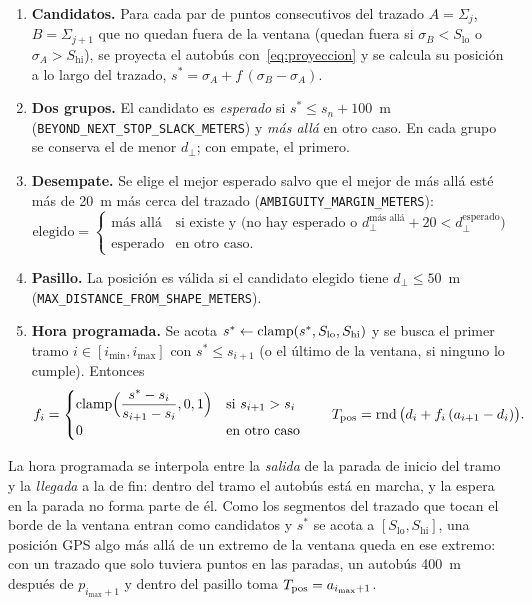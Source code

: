 \begin{enumerate}
  \item \textbf{Candidatos.} Para cada par de puntos consecutivos del trazado $A=\Sigma_j$, $B=\Sigma_{j+1}$ que no
        quedan fuera de la ventana (quedan fuera si $\sigma_B<S_{\mathrm{lo}}$ o $\sigma_A>S_{\mathrm{hi}}$), se
        proyecta el autobús con~\eqref{eq:proyeccion} y se calcula su posición a lo largo del trazado,
        $s^\ast=\sigma_A+f\,(\sigma_B-\sigma_A)$.
  \item \textbf{Dos grupos.} El candidato es \emph{esperado} si $s^\ast\le s_n+100$~m
        (\texttt{BEYOND\_NEXT\_STOP\_SLACK\_METERS}) y \emph{más allá} en otro caso. En cada grupo se conserva el de menor
        $d_\perp$; con empate, el primero.
  \item \textbf{Desempate.} Se elige el mejor esperado salvo que el mejor de más allá esté más de 20~m más cerca del
        trazado (\texttt{AMBIGUITY\_MARGIN\_METERS}):
        \[
        \text{elegido}=\begin{cases}\text{más allá}&\text{si existe y } \big(\text{no hay esperado o }d_\perp^{\text{más allá}}+20<d_\perp^{\text{esperado}}\big)\\
        \text{esperado}&\text{en otro caso.}\end{cases}
        \]
  \item \textbf{Pasillo.} La posición es válida si el candidato elegido tiene $d_\perp\le50$~m
        (\texttt{MAX\_DISTANCE\_FROM\_SHAPE\_METERS}).
  \item \textbf{Hora programada.} Se acota $s^\ast\leftarrow\operatorname{clamp}(s^\ast,S_{\mathrm{lo}},S_{\mathrm{hi}})$ y se
        busca el primer tramo $i\in[i_{\min},i_{\max}]$ con $s^\ast\le s_{i+1}$ (o el último de la ventana, si ninguno lo
        cumple). Entonces
        \begin{equation}
        \label{eq:tpos}
        f_i=\begin{cases}\operatorname{clamp}\!\Big(\dfrac{s^\ast-s_i}{s_{i+1}-s_i},0,1\Big)&\text{si }s_{i+1}>s_i\\ 0&\text{en otro caso}\end{cases}
        \qquad
        T_{\mathrm{pos}}=\operatorname{rnd}\big(d_i+f_i\,(a_{i+1}-d_i)\big).
        \end{equation}
\end{enumerate}

La hora programada se interpola entre la \emph{salida} de la parada de inicio del tramo y la \emph{llegada} a la de
fin: dentro del tramo el autobús está en marcha, y la espera en la parada no forma parte de él. Como los segmentos del
trazado que tocan el borde de la ventana entran como candidatos y $s^\ast$ se acota a $[S_{\mathrm{lo}},S_{\mathrm{hi}}]$,
una posición GPS algo más allá de un extremo de la ventana queda en ese extremo: con un trazado que solo tuviera
puntos en las paradas, un autobús 400~m después de $p_{i_{\max}+1}$ y dentro del pasillo toma $T_{\mathrm{pos}}=a_{i_{\max}+1}$.

